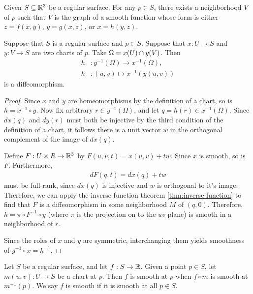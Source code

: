 \begin{thm}
    Given $S \subseteq \mathbb{R}^3$ be a regular surface. For any $p \in S$, there exists a neighborhood $V$ of $p$ such that $V$ is the graph of a smooth function whose form is either $z = f(x, y)$, $y = g(x, z)$, or $x = h(y, z)$.
\end{thm}

\begin{lemma}\label{lemma:change-of-chart}
    Suppose that $S$ is a regular surface and $p \in S$. Suppose that $x: U \to S$ and $y: V \to S$ are two charts of $p$. Take $\Omega = x(U) \cap y(V)$. Then
    \begin{align*}
        h&: y^{-1}(\Omega) \to x^{-1}(\Omega), \\
        h&: (u, v) \mapsto x^{-1}(y(u, v))
    \end{align*}
    is a diffeomorphism.
\end{lemma}

\begin{proof}
    Since $x$ and $y$ are homeomorphisms by the definition of a chart, so is $h = x^{-1} \circ y$. Now fix arbitrary $r \in y^{-1}(\Omega)$, and let $q = h(r) \in x^{-1}(\Omega)$. Since $dx(q)$ and $dy(r)$ must both be injective by the third condition of the definition of a chart, it follows there is a unit vector $w$ in the orthogonal complement of the image of $dx(q)$.

    Define $F: U \times R \to \mathbb{R}^3$ by $F(u, v, t) = x(u, v) + tw$. Since $x$ is smooth, so is $F$. Furthermore,
    \begin{align*}
        dF(q, t) = dx(q) + tw
    \end{align*}
    must be full-rank, since $dx(q)$ is injective and $w$ is orthogonal to it's image. Therefore, we can apply the inverse function theorem \ref{thm:inverse-function} to find that $F$ is a diffeomorphism in some neighborhood $M$ of $(q, 0)$. Therefore, $h = \pi \circ F^{-1} \circ y$ (where $\pi$ is the projection on to the $uv$ plane) is smooth in a neighborhood of $r$.

    Since the roles of $x$ and $y$ are symmetric, interchanging them yields smoothness of $y^{-1} \circ x = h^{-1}$.
\end{proof}

\begin{defn}
    Let $S$ be a regular surface, and let $f: S \to \mathbb{R}$. Given a point $p \in S$, let $m(u, v): U \to S$ be a chart at $p$. Then $f$ is smooth at $p$ when $f \circ m$ is smooth at $m^{-1}(p)$. We say $f$ is smooth if it is smooth at all $p \in S$.
\end{defn}


